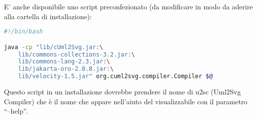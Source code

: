 E' anche disponibile uno script preconfezionato (da modificare in modo da
aderire alla cartella di installazione):

\begin{lstlisting}[caption={Output dell'help da linea di comando}, style={none},language=sh]
#!/bin/bash

java -cp "lib/cUml2Svg.jar:\
	lib/commons-collections-3.2.jar:\
 	lib/commons-lang-2.3.jar:\
 	lib/jakarta-oro-2.0.8.jar:\
 	lib/velocity-1.5.jar" org.cuml2svg.compiler.Compiler $@
\end{lstlisting}

Questo script in un installazione dovrebbe prendere il nome di u2sc (Uml2Svg
Compiler) che è il nome che appare nell'aiuto del visualizzabile con il
parametro ``--help''.

